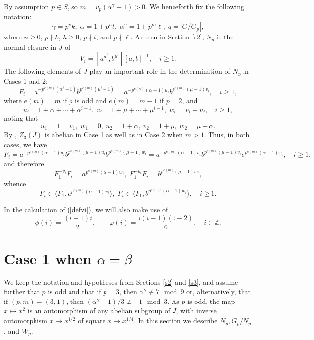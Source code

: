 \documentclass{amsart}
\theoremstyle{definition}
\theoremstyle{remark}
\newcommand \Z{{\mathbb Z}}
\begin{document}


By assumption $p\in S$, so $m=v_p(\alpha^\gamma-1)>0$. We henceforth fix the following notation:
$$
\gamma=p^n k,\; \alpha=1+p^h t,\; \alpha^\gamma=1+p^m\ell,\; q=|G/G_p|,
$$
where $n\geq 0$, $p\nmid k$, $h\geq 0$, $p\nmid t$,  and $p\nmid \ell$. As seen in Section \ref{s2},
$N_p$ is the normal closure in $J$ of 
\begin{equation}
\label{defvi}
V_i=[a^{\alpha^i},b^{\mu^i}][a,b]^{-1},\quad i\geq 1.
\end{equation}
The following elements of $J$ play an important role in the determination of $N_p$ in Cases 1 and 2:
\begin{equation}
\label{deffi}
F_i=a^{-p^{e(m)}(\alpha^i-1)} b^{p^{e(m)}(\mu^i-1)}=a^{-p^{e(m)}(\alpha-1)u_i} b^{p^{e(m)}(\mu-1)v_i},\quad i\geq 1,
\end{equation}
where $e(m)=m$ if $p$ is odd and $e(m)=m-1$ if $p=2$, and
\begin{equation}
\label{defui}
u_i=1+\alpha+\cdots+\alpha^{i-1},\; v_i=1+\mu+\cdots+\mu^{i-1},\; w_i=v_i-u_i,\quad i\geq 1,
\end{equation}
noting that
$$
u_1=1=v_1,\; w_1=0,\; u_2=1+\alpha,\; v_2=1+\mu,\; w_2=\mu-\alpha.
$$
By \cite[Propositions 9.1 and 9.2]{MS}, $Z_3(J)$ is abelian in Case 1 as well as in Case 2 when $m>1$.
Thus, in both cases, we have
$$
F_i=a^{-p^{e(m)}(\alpha-1)u_i} b^{p^{e(m)}(\mu-1)u_i}b^{p^{e(m)}(\mu-1)w_i}=
a^{-p^{e(m)}(\alpha-1)v_i} b^{p^{e(m)}(\mu-1)v_i}a^{p^{e(m)}(\alpha-1)w_i},\quad i\geq 1,
$$
and therefore
\begin{equation}
\label{vui}
F_1^{-v_i} F_i=a^{p^{e(m)}(\alpha-1)w_i},\; F_1^{-u_i} F_i=b^{p^{e(m)}(\mu-1)w_i},
\end{equation}
whence
\begin{equation}
\label{vui2}
F_i\in \langle F_1, a^{p^{e(m)}(\alpha-1)w_i}\rangle,\; F_i\in \langle F_1, b^{p^{e(m)}(\alpha-1)w_i}\rangle,\quad i\geq 1.
\end{equation}

In the calculation of (\ref{defvi}), we will also make use of
\[
\phi(i) = \frac{(i-1)i}{2},
\qquad\varphi(i) = \frac{i(i-1)(i-2)}{6},\quad i\in\Z.
\]


\section{Case 1 when $\alpha=\beta$}\label{s4}

We keep the notation and hypotheses from Sections \ref{s2} and \ref{s3}, and assume further 
that $p$ is odd and that if $p=3$, then $\alpha^\gamma\not\equiv 7\mod 9$ or,
alternatively, that if $(p,m)=(3,1)$, then $(\alpha^\gamma-1)/3\not\equiv -1\mod 3$.
As $p$ is odd,  the map $x\mapsto x^2$ is an automorphism of any abelian subgroup of $J$,
with inverse automorphism $x\mapsto x^{1/2}$ of square  $x\mapsto x^{1/4}$.
In this section we describe $N_p, G_p/N_p$, and $W_p$.
\end{document}

